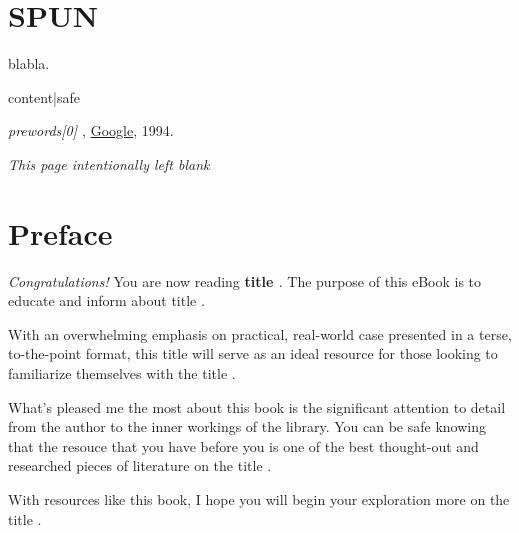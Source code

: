 \documentclass{article}
\begin{document}
\clearpage


\section*{SPUN}

{\normalsize
  blabla.\cite{satu}

  {{ content|safe }} 
}

\clearpage

\begin{thebibliography}{99}

\emph{ {{ prewords[0] }} }, \href{http://www.google.com}{Google}, 1994.

\end{thebibliography}

\clearpage

\noindent
\begin{center}
{\normalsize \emph{This page intentionally left blank}}
\end{center}

\clearpage

\section*{Preface}
{\normalsize
\begin{flushleft}
\emph{Congratulations!} You are now reading \textbf{ {{ title }} }. The
purpose of this eBook is to educate and inform about {{ title }}.
\end{flushleft}

\begin{flushleft}
With an overwhelming emphasis on practical, real-world case presented
in a terse, to-the-point format, this {{ title }} will serve as an
ideal resource for those looking to familiarize themselves with the 
{{ title }}.
\end{flushleft}

\begin{flushleft}
What's pleased me the most about this book is the significant
attention to detail from the author to the inner workings of the
library. You can be safe knowing that the resouce that you have before
you is one of the best thought-out and researched pieces of literature
on the {{ title }}.
\end{flushleft}

\begin{flushleft}
With resources like this book, I hope you will begin your exploration
more on the {{ title }}.
\end{flushleft}
}
\end{document}
